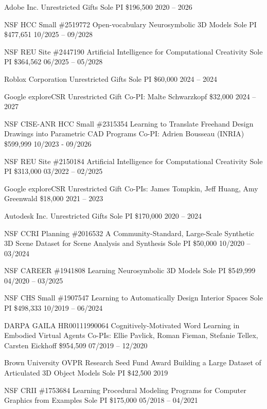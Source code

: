 \documentclass[line,margin]{res}
\begin{document}
\begin{resume}
\funding
{Adobe Inc.}
{Unrestricted Gifts}
{Sole PI}
{\$196,500}
{2020 -- 2026}

\funding
{NSF HCC Small \#2519772}
{Open-vocabulary Neurosymbolic 3D Models}
{Sole PI}
{\$477,651}
{10/2025 -- 09/2028}

\funding
{NSF REU Site \#2447190}
{Artificial Intelligence for Computational Creativity}
{Sole PI}
{\$364,562}
{06/2025 -- 05/2028}

\funding
{Roblox Corporation}
{Unrestricted Gifts}
{Sole PI}
{\$60,000}
{2024 -- 2024}

\funding
{Google exploreCSR}
{Unrestricted Gift}
{Co-PI: Malte Schwarzkopf}
{\$32,000}
{2024 -- 2027}

\funding
{NSF CISE-ANR HCC Small \#2315354}
{Learning to Translate Freehand Design Drawings into Parametric CAD Programs}
{Co-PI: Adrien Bousseau (INRIA)}
{\$599,999}
{10/2023 - 09/2026}

\funding
{NSF REU Site \#2150184}
{Artificial Intelligence for Computational Creativity}
{Sole PI}
{\$313,000}
{03/2022 -- 02/2025}

\funding
{Google exploreCSR}
{Unrestricted Gift}
{Co-PIs: James Tompkin, Jeff Huang, Amy Greenwald}
{\$18,000}
{2021 -- 2023}

\funding
{Autodesk Inc.}
{Unrestricted Gifts}
{Sole PI}
{\$170,000}
{2020 -- 2024}

\funding
{NSF CCRI Planning \#2016532}
{A Community-Standard, Large-Scale Synthetic 3D Scene Dataset for Scene Analysis and Synthesis}
{Sole PI}
{\$50,000}
{10/2020 -- 03/2024}

\funding
{NSF CAREER \#1941808}
{Learning Neurosymbolic 3D Models}
{Sole PI}
{\$549,999}
{04/2020 -- 03/2025}

\funding
{NSF CHS Small \#1907547}
{Learning to Automatically Design Interior Spaces}
{Sole PI}
{\$498,333}
{10/2019 -- 06/2024}

\funding
{DARPA GAILA HR00111990064}
{Cognitively-Motivated Word Learning in Embodied Virtual Agents}
{Co-PIs: Ellie Pavlick, Roman Fieman, Stefanie Tellex, Carsten Eickhoff}
{\$954,509}
{07/2019 -- 12/2020}

\funding
{Brown University OVPR Research Seed Fund Award}
{Building a Large Dataset of Articulated 3D Object Models}
{Sole PI}
{\$42,500}
{2019}

\funding
{NSF CRII \#1753684}
{Learning Procedural Modeling Programs for Computer Graphics from Examples}
{Sole PI}
{\$175,000}
{05/2018 -- 04/2021}



\end{resume}
\end{document}
